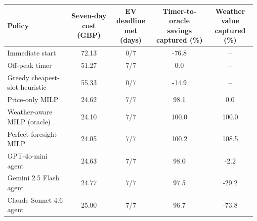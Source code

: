 \begin{tabular}{lcccc}
\toprule
Policy & \makecell{Seven-day cost\\(GBP)} & \makecell{EV deadline\\met (days)} & \makecell{Timer-to-oracle\\savings captured (\%)} & \makecell{Weather value\\captured (\%)} \\
\midrule
Immediate start & 72.13 & 0/7 & -76.8 & -- \\
Off-peak timer & 51.27 & 7/7 & 0.0 & -- \\
Greedy cheapest-slot heuristic & 55.33 & 0/7 & -14.9 & -- \\
\midrule
Price-only MILP & 24.62 & 7/7 & 98.1 & 0.0 \\
Weather-aware MILP (oracle) & 24.10 & 7/7 & 100.0 & 100.0 \\
Perfect-foresight MILP & 24.05 & 7/7 & 100.2 & 108.5 \\
\midrule
GPT-4o-mini agent & 24.63 & 7/7 & 98.0 & -2.2 \\
Gemini 2.5 Flash agent & 24.77 & 7/7 & 97.5 & -29.2 \\
Claude Sonnet 4.6 agent & 25.00 & 7/7 & 96.7 & -73.8 \\
\bottomrule
\end{tabular}
